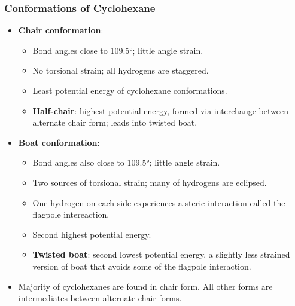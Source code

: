 \documentclass[12pt,a4paper]{article}
\begin{document}
\begin{itemize}
    \subsubsection{Conformations of Cyclohexane}
    \begin{itemize}
        \item \textbf{Chair conformation}:
            \begin{itemize}
                \item Bond angles close to \ang{109.5}; little angle strain.
                \item No torsional strain; all hydrogens are staggered.
                \item Least potential energy of cyclohexane conformations.
                \item \textbf{Half-chair}: highest potential energy, formed via interchange between alternate chair form; leads into twisted boat.
            \end{itemize}
        \item \textbf{Boat conformation}: 
            \begin{itemize}
                \item Bond angles also close to \ang{109.5}; little angle strain.
                \item Two sources of torsional strain; many of hydrogens are eclipsed.
                \item One hydrogen on each side experiences a steric interaction called the {\color{o-Sun}flagpole intereaction}.
                \item Second highest potential energy.
                \item \textbf{Twisted boat}: second lowest potential energy, a slightly less strained version of boat that avoids some of the flagpole interaction.
            \end{itemize}
        \item Majority of cyclohexanes are found in chair form. All other forms are intermediates between alternate chair forms.
    \end{itemize}

\end{itemize}
\end{document}
